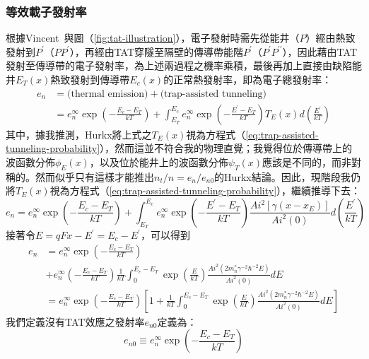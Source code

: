 \subsubsection{等效載子發射率}
根據Vincent~\cite{vincent1979electric}與圖（\ref{fig:tat-illustration}），電子發射時需先從能井（$P$）經由熱致發射到$P^\prime$（$PP^\prime$），再經由TAT穿隧至隔壁的傳導帶能階$P^\prime$（$P^\prime P^{\prime\prime}$），因此藉由TAT發射至傳導帶的電子發射率，為上述兩過程之機率乘積，最後再加上直接由缺陷能井$E_T(x)$熱致發射到傳導帶$E_c(x)$的正常熱發射率，即為電子總發射率：
\begin{equation}
\begin{aligned}
e_n&=\text{(thermal emission)}+\text{(trap-assisted tunneling)}\\[5pt]
&=e_n^\infty\exp\left(-\frac{E_c-E_T}{kT}\right)+\int_{E_T}^{E_c}e_n^\infty\exp\left(-\frac{E^\prime-E_T}{kT}\right)T_E(x)d\left(\frac{E^\prime}{kT}\right)
\end{aligned}
\end{equation}
其中，據我推測，Hurkx將上式之$T_E(x)$視為方程式（\ref{eq:trap-assisted-tunneling-probability}），然而這並不符合我的物理直覺；我覺得位於傳導帶上的波函數分佈$\phi_E(x)$，以及位於能井上的波函數分佈$\psi_{T}(x)$應該是不同的，而非對稱的。然而似乎只有這樣才能推出$n_t/n=e_n/e_{n0}$的Hurkx結論。因此，現階段我仍將$T_E(x)$視為方程式（\ref{eq:trap-assisted-tunneling-probability}），繼續推導下去：
\begin{equation}
e_n=e_n^\infty\exp\left(-\frac{E_c-E_T}{kT}\right)+\int_{E_T}^{E_c}e_n^\infty\exp\left(-\frac{E^\prime-E_T}{kT}\right)\frac{Ai^2\left[\gamma(x-x_E)\right]}{Ai^2(0)}d\left(\frac{E^\prime}{kT}\right)
\end{equation}
接著令$E=qFx-E^\prime=E_c-E^\prime$，可以得到
\begin{equation}
\begin{aligned}
e_n&=e_n^\infty\exp\left(-\frac{E_c-E_T}{kT}\right)\\[5pt]
&+e_n^\infty\left(-\frac{E_c-E_T}{kT}\right)\frac{1}{kT}\int_0^{E_c-E_T}\exp\left(\frac{E}{kT}\right)\frac{Ai^2(2m_n^*\gamma^{-2}\hbar^{-2}E)}{Ai^2(0)}dE\\[5pt]
&=e_n^\infty\exp\left(-\frac{E_c-E_T}{kT}\right)\left[1+\frac{1}{kT}\int_0^{E_c-E_T}\exp\left(\frac{E}{kT}\right)\frac{Ai^2(2m_n^*\gamma^{-2}\hbar^{-2}E)}{Ai^2(0)}dE\right]
\end{aligned}
\end{equation}
我們定義沒有TAT效應之發射率$e_{n0}$定義為：
\begin{equation}
e_{n0}\equiv e_n^\infty\exp\left(-\frac{E_c-E_T}{kT}\right)
\end{equation}
